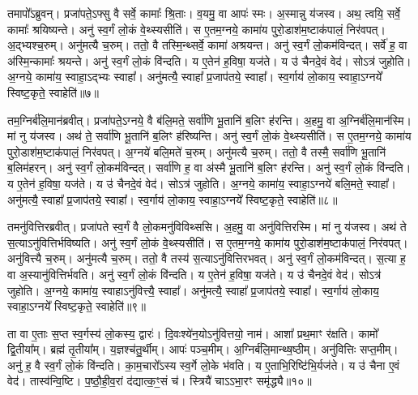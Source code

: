    तमापो᳚ऽब्रुवन्।
   प्रजा॑पते॒ऽफ्सु वै सर्वे॒ कामाः᳚ श्रि॒ताः।
   व॒यमु॒ वा आपः॑ स्मः।
   अ॒स्मान्नु य॑जस्व।
   अथ॒ त्वयि॒ सर्वे॒ कामाः᳚ श्रयिष्यन्ते।
   अनु॑ स्व॒र्गं लो॒कं वे॒थ्स्यसीति॑।
   स ए॒तम॒ग्नये॒ कामा॑य पुरो॒डाश॑म॒ष्टाक॑पालं॒ निर॑वपत्।
   अ॒द्भ्यश्च॒रुम्।
   अनु॑मत्यै च॒रुम्।
   ततो॒ वै तस्मि॒न्थ्सर्वे॒ कामा॑ अश्रयन्त।
   अनु॑ स्व॒र्गं लो॒कम॑विन्दत्।
   सर्वे॑ ह॒ वा अ॑स्मि॒न्कामाः᳚ श्रयन्ते।
   अनु॑ स्व॒र्गं लो॒कं वि॑न्दति।
   य ए॒तेन॑ ह॒विषा॒ यज॑ते।
   य उ॑ चैनदे॒वं वेद॑।
   सोऽत्र॑ जुहोति।
   अ॒ग्नये॒ कामा॑य॒ स्वाहा॒ऽद्भ्यः स्वाहा᳚।
   अनु॑मत्यै॒ स्वाहा᳚ प्र॒जाप॑तये॒ स्वाहा᳚।
   स्व॒र्गाय॑ लो॒काय॒ स्वाहा॒ऽग्नये᳚ स्विष्ट॒कृते॒ स्वाहेति॑॥७॥

   तम॒ग्निर्ब॑लि॒मान॑ब्रवीत्।
   प्रजा॑पते॒ऽग्नये॒ वै ब॑लि॒मते॒ सर्वा॑णि भू॒तानि॑ ब॒लिꣳ ह॑रन्ति।
   अ॒हमु॒ वा अ॒ग्निर्ब॑लि॒मान॑स्मि।
   मां नु य॑जस्व।
   अथ॑ ते॒ सर्वा॑णि भू॒तानि॑ ब॒लिꣳ ह॑रिष्यन्ति।
   अनु॑ स्व॒र्गं लो॒कं वे॒थ्स्यसीति॑।
   स ए॒तम॒ग्नये॒ कामा॑य पुरो॒डाश॑म॒ष्टाक॑पालं॒ निर॑वपत्।
   अ॒ग्नये॑ बलि॒मते॑ च॒रुम्।
   अनु॑मत्यै च॒रुम्।
   ततो॒ वै तस्मै॒ सर्वा॑णि भू॒तानि॑ ब॒लिम॑हरन्।
   अनु॑ स्व॒र्गं लो॒कम॑विन्दत्।
   सर्वा॑णि ह॒ वा अ॑स्मै भू॒तानि॑ ब॒लिꣳ ह॑रन्ति।
   अनु॑ स्व॒र्गं लो॒कं वि॑न्दति।
   य ए॒तेन॑ ह॒विषा॒ यज॑ते।
   य उ॑ चैनदे॒वं वेद॑।
   सोऽत्र॑ जुहोति।
   अ॒ग्नये॒ कामा॑य॒ स्वाहा॒ऽग्नये॑ बलि॒मते॒ स्वाहा᳚।
   अनु॑मत्यै॒ स्वाहा᳚ प्र॒जाप॑तये॒ स्वाहा᳚।
   स्व॒र्गाय॑ लो॒काय॒ स्वाहा॒ऽग्नये᳚ स्विष्ट॒कृते॒ स्वाहेति॑॥८॥

   तमनु॑वित्तिरब्रवीत्।
   प्रजा॑पते स्व॒र्गं वै लो॒कमनु॑विविथ्ससि।
   अ॒हमु॒ वा अनु॑वित्तिरस्मि।
   मां नु य॑जस्व।
   अथ॑ ते स॒त्याऽनु॑वित्तिर्भविष्यति।
   अनु॑ स्व॒र्गं लो॒कं वे॒थ्स्यसीति॑।
   स ए॒तम॒ग्नये॒ कामा॑य पुरो॒डाश॑म॒ष्टाक॑पालं॒ निर॑वपत्।
   अनु॑वित्त्यै च॒रुम्।
   अनु॑मत्यै च॒रुम्।
   ततो॒ वै तस्य॑ स॒त्याऽनु॑वित्तिरभवत्।
   अनु॑ स्व॒र्गं लो॒कम॑विन्दत्।
   स॒त्या ह॒ वा अ॒स्यानु॑वित्तिर्भवति।
   अनु॑ स्व॒र्गं लो॒कं वि॑न्दति।
   य ए॒तेन॑ ह॒विषा॒ यज॑ते।
   य उ॑ चैनदे॒वं वेद॑।
   सोऽत्र॑ जुहोति।
   अ॒ग्नये॒ कामा॑य॒ स्वाहाऽनु॑वित्त्यै॒ स्वाहा᳚।
   अनु॑मत्यै॒ स्वाहा᳚ प्र॒जाप॑तये॒ स्वाहा᳚।
   स्व॒र्गाय॑ लो॒काय॒ स्वाहा॒ऽग्नये᳚ स्विष्ट॒कृते॒ स्वाहेति॑॥९॥

   ता वा ए॒ताः स॒प्त स्व॒र्गस्य॑ लो॒कस्य॒ द्वारः॑।
   दि॒वःश्ये॑न॒योऽनु॑\-वित्तयो॒ नाम॑।
   आशा᳚ प्रथ॒माꣳ र॑क्षति।
   कामो᳚ द्वि॒तीया᳚म्।
   ब्रह्म॑ तृ॒तीया᳚म्।
   य॒ज्ञश्च॑तु॒र्थीम्।
   आपः॑ पञ्च॒मीम्।
   अ॒ग्निर्ब॑लि॒मान्थ्ष॒ष्ठीम्।
   अनु॑वित्तिः सप्त॒मीम्।
   अनु॑ ह॒ वै स्व॒र्गं लो॒कं वि॑न्दति।
   का॒म॒चारो᳚ऽस्य स्व॒र्गे लो॒के भ॑वति।
   य ए॒ताभि॒रिष्टि॑भि॒र्यज॑ते।
   य उ॑ चैना ए॒वं वेद॑।
   तास्व॑न्वि॒ष्टि।
   प॒ष्ठौ॒ही॒व॒रां द॑द्यात्क॒ꣳ॒सं च॑।
   स्त्रियै॑ चाऽऽभा॒रꣳ समृ॑द्ध्यै॥१०॥\anuvakamend
  
